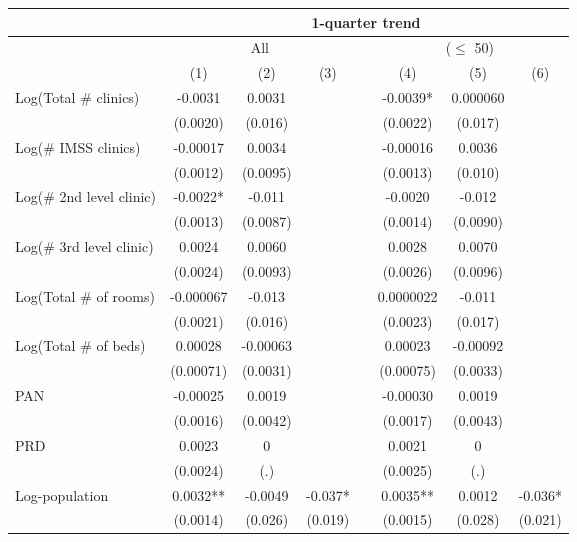 \begin{tabular}{lccccccc}
\toprule
      & \multicolumn{7}{c}{1-quarter trend} \\
\midrule
      & \multicolumn{3}{c}{All} &       & \multicolumn{3}{c}{($\leq$ 50)} \\
\cmidrule{2-4}\cmidrule{6-8}      & (1)   & (2)   & (3)   &       & (4)   & (5)   & (6) \\
\midrule
\midrule
Log(Total \# clinics) & -0.0031 & 0.0031 &       &       & -0.0039* & 0.000060 &  \\
      & (0.0020) & (0.016) &       &       & (0.0022) & (0.017) &  \\
Log(\# IMSS clinics) & -0.00017 & 0.0034 &       &       & -0.00016 & 0.0036 &  \\
      & (0.0012) & (0.0095) &       &       & (0.0013) & (0.010) &  \\
Log(\# 2nd level clinic) & -0.0022* & -0.011 &       &       & -0.0020 & -0.012 &  \\
      & (0.0013) & (0.0087) &       &       & (0.0014) & (0.0090) &  \\
Log(\# 3rd level clinic) & 0.0024 & 0.0060 &       &       & 0.0028 & 0.0070 &  \\
      & (0.0024) & (0.0093) &       &       & (0.0026) & (0.0096) &  \\
Log(Total \# of rooms) & -0.000067 & -0.013 &       &       & 0.0000022 & -0.011 &  \\
      & (0.0021) & (0.016) &       &       & (0.0023) & (0.017) &  \\
Log(Total \# of beds) & 0.00028 & -0.00063 &       &       & 0.00023 & -0.00092 &  \\
      & (0.00071) & (0.0031) &       &       & (0.00075) & (0.0033) &  \\
PAN   & -0.00025 & 0.0019 &       &       & -0.00030 & 0.0019 &  \\
      & (0.0016) & (0.0042) &       &       & (0.0017) & (0.0043) &  \\
PRD   & 0.0023 & 0     &       &       & 0.0021 & 0     &  \\
      & (0.0024) & (.)   &       &       & (0.0025) & (.)   &  \\
\midrule
Log-population & 0.0032** & -0.0049 & -0.037* &       & 0.0035** & 0.0012 & -0.036* \\
      & (0.0014) & (0.026) & (0.019) &       & (0.0015) & (0.028) & (0.021) \\

\end{tabular}
